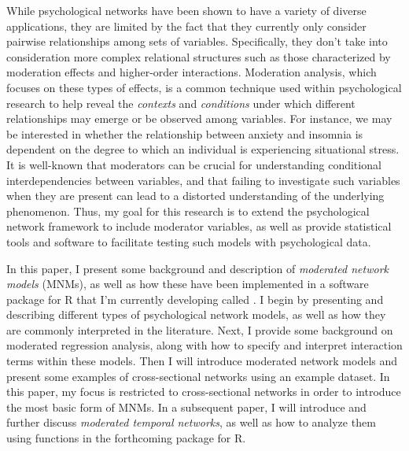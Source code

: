 While psychological networks have been shown to have a variety of diverse applications, they are limited by the fact that they currently only consider pairwise relationships among sets of variables. Specifically, they don’t take into consideration more complex relational structures such as those characterized by moderation effects and higher-order interactions. Moderation analysis, which focuses on these types of effects, is a common technique used within psychological research to help reveal the \textit{contexts} and \textit{conditions} under which different relationships may emerge or be observed among variables. For instance, we may be interested in whether the relationship between anxiety and insomnia is dependent on the degree to which an individual is experiencing situational stress. It is well-known that moderators can be crucial for understanding conditional interdependencies between variables, and that failing to investigate such variables when they are present can lead to a distorted understanding of the underlying phenomenon. Thus, my goal for this research is to extend the psychological network framework to include moderator variables, as well as provide statistical tools and software to facilitate testing such models with psychological data. 

In this paper, I present some background and description of \textit{moderated network models} (MNMs), as well as how these have been implemented in a software package for R that I'm currently developing called . I begin by presenting and describing different types of psychological network models, as well as how they are commonly interpreted in the literature. Next, I provide some background on moderated regression analysis, along with how to specify and interpret interaction terms within these models. Then I will introduce moderated network models and present some examples of cross-sectional networks using an example dataset. In this paper, my focus is restricted to cross-sectional networks in order to introduce the most basic form of MNMs. In a subsequent paper, I will introduce and further discuss \textit{moderated temporal networks}, as well as how to analyze them using functions in the forthcoming  package for R. 

